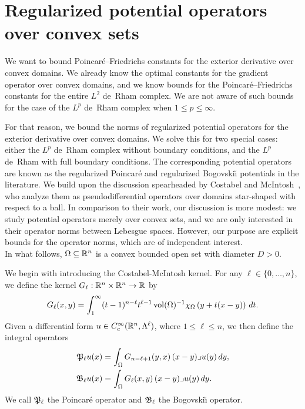 \documentclass[10pt,letterpaper]{article}
\begin{document}
\section{Regularized potential operators over convex sets}\label{section:potentialoperator}

We want to bound Poincar\'e--Friedrichs constants for the exterior derivative over convex domains.
We already know the optimal constants for the gradient operator over convex domains,
and we know bounds for the Poincar\'e--Friedrichs constants for the entire $L^{2}$ de~Rham complex. 
We are not aware of such bounds for the case of the $L^{p}$ de~Rham complex when $1 \leq p \leq \infty$. 

For that reason, we bound the norms of regularized potential operators for the exterior derivative over convex domains.
We solve this for two special cases: either the $L^{p}$ de~Rham complex without boundary conditions, 
and the $L^{p}$ de~Rham with full boundary conditions. 
The corresponding potential operators are known as the regularized Poincar\'e and regularized Bogovski\u{\i} potentials in the literature. 
We build upon the discussion spearheaded by Costabel and McIntosh~\cite{costabel2010bogovskiui},
who analyze them as pseudodifferential operators over domains star-shaped with respect to a ball. 
% 
In comparison to their work, our discussion is more modest:
we study potential operators merely over convex sets, and we are only interested in their operator norms between Lebesgue spaces.
However, our purpose are explicit bounds for the operator norms, which are of independent interest. 
\\

In what follows, $\Omega \subseteq {\mathbb R}^{n}$ is a convex bounded open set with diameter $D > 0$.

We begin with introducing the Costabel-McIntosh kernel.
For any $\ell \in \{0,\dotsc,n\}$, we define the kernel $G_{\ell} : {\mathbb R}^{n} \times {\mathbb R}^{n} \rightarrow {\mathbb R}$ by
\begin{equation}\label{math:mainkernel}
  G_{\ell}(x,y) = \int_{1}^\infty (t-1)^{n-\ell}t^{\ell-1} \operatorname{vol}(\Omega)^{-1}\chi_{\Omega} \left(y+t(x-y)\right)\,dt
  .
\end{equation}
Given a differential form $u \in {C^\infty_c}({\mathbb R}^n,\Lambda^\ell)$, where \(1 \leq \ell \leq n\), 
we then define the integral operators
\begin{align*}
  {\mathfrak P}_{\ell} u(x) &= \int_{\Omega} G_{n-\ell+1}(y,x) \,(x-y)\lrcorner u(y)\,dy,
  \\
  {\mathfrak B}_{\ell} u(x) &= \int_{\Omega} G_{\ell}(x,y) \,(x-y)\lrcorner u(y)\,dy.
\end{align*}
We call ${\mathfrak P}_{\ell}$ the Poincar\'e operator and ${\mathfrak B}_{\ell}$ the Bogovski\u{\i} operator. 
\\
\end{document}
